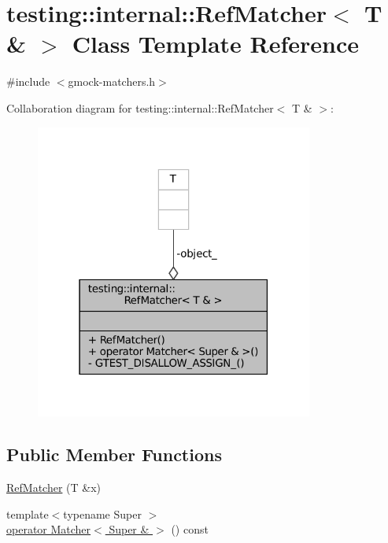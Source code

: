 \hypertarget{classtesting_1_1internal_1_1RefMatcher_3_01T_01_6_01_4}{}\section{testing\+:\+:internal\+:\+:Ref\+Matcher$<$ T \& $>$ Class Template Reference}
\label{classtesting_1_1internal_1_1RefMatcher_3_01T_01_6_01_4}


{\ttfamily \#include $<$gmock-\/matchers.\+h$>$}



Collaboration diagram for testing\+:\+:internal\+:\+:Ref\+Matcher$<$ T \& $>$\+:
\nopagebreak
\begin{figure}[H]
\begin{center}
\leavevmode
\includegraphics[width=259pt]{classtesting_1_1internal_1_1RefMatcher_3_01T_01_6_01_4__coll__graph}
\end{center}
\end{figure}
\subsection*{Public Member Functions}
\begin{DoxyCompactItemize}
\item 
\hyperlink{classtesting_1_1internal_1_1RefMatcher_3_01T_01_6_01_4_a94eaec01f11b3ed704092a62cdb9c21c}{Ref\+Matcher} (T \&x)
\item 
{\footnotesize template$<$typename Super $>$ }\\\hyperlink{classtesting_1_1internal_1_1RefMatcher_3_01T_01_6_01_4_ac146f2d10f0b2e361f903225be15d1a9}{operator Matcher$<$ Super \& $>$} () const
\end{DoxyCompactItemize}
